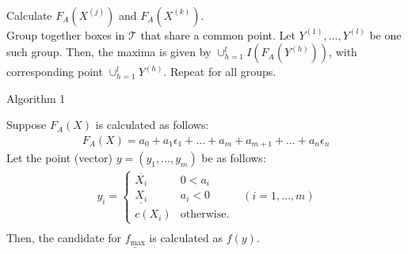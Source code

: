 \documentclass[12pt]{scrartcl} %
\begin{document}
\begin{algorithm}
{{\begin{align}
            \end{align}
        }
        Calculate $F_A(X^{(j)})$ and $F_A(X^{(k)})$.\\
    }
    Group together boxes in $\mathcal{T}$ that share a common point. Let $Y^{(1)},...,Y^{(l)}$ be one such group. Then, the maxima is given by $\cup_{h=1}^l I(F_A(Y^{(h)}))$, with corresponding point $\cup_{h=1}^l Y^{(h)}$. Repeat for all groups.
\end{algorithm}
    

\begin{algorithm}
    \caption{Algorithm 1}\label{alg:algorithm-1}

    Suppose $F_A(X)$ is calculated as follows:
    \begin{align}
        F_A(X) = a_0 + a_1 \epsilon_1 + ... + a_m + a_{m+1} + ... + a_n \epsilon_n\label{eq:fa}
    \end{align}
    Let the point (vector) $y=(y_1, ..., y_m)$ be as follows:
    \begin{align}
        y_i = 
        \begin{cases}
            \overline{X_i} & 0 < a_i\\
            \underline{X_i} & a_i < 0\\
            c(X_i) & \text{otherwise}.
        \end{cases}
        & (i=1,...,m)\\
    \end{align}
    Then, the candidate for $\underline{f_{\max}}$ is calculated as $f(y)$.
\end{algorithm}
\end{document}
